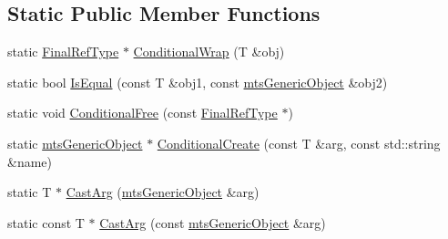 \subsection*{Static Public Member Functions}
\begin{DoxyCompactItemize}
\item 
static \hyperlink{classmts_generic_types_impl_3_01_t_00_01true_01_4_a76ded5912b20f9057bf7835ca04cfb89}{Final\-Ref\-Type} $\ast$ \hyperlink{classmts_generic_types_impl_3_01_t_00_01true_01_4_aef2b40c8a72a6fbe7aecc055f259c5c6}{Conditional\-Wrap} (T \&obj)
\item 
static bool \hyperlink{classmts_generic_types_impl_3_01_t_00_01true_01_4_a8b7cc64482c685ad2be96d0906bc18d2}{Is\-Equal} (const T \&obj1, const \hyperlink{classmts_generic_object}{mts\-Generic\-Object} \&obj2)
\item 
static void \hyperlink{classmts_generic_types_impl_3_01_t_00_01true_01_4_a4eb2f1e60e027075ca90cf7a23a5f3fc}{Conditional\-Free} (const \hyperlink{classmts_generic_types_impl_3_01_t_00_01true_01_4_a76ded5912b20f9057bf7835ca04cfb89}{Final\-Ref\-Type} $\ast$)
\item 
static \hyperlink{classmts_generic_object}{mts\-Generic\-Object} $\ast$ \hyperlink{classmts_generic_types_impl_3_01_t_00_01true_01_4_a289a718404559aac15f4952f407e9149}{Conditional\-Create} (const T \&arg, const std\-::string \&name)
\item 
static T $\ast$ \hyperlink{classmts_generic_types_impl_3_01_t_00_01true_01_4_ae9a9bd60b09ed13ef953e329863f382b}{Cast\-Arg} (\hyperlink{classmts_generic_object}{mts\-Generic\-Object} \&arg)
\item 
static const T $\ast$ \hyperlink{classmts_generic_types_impl_3_01_t_00_01true_01_4_a790b68e26f2a7aec9fde15cbf2372eed}{Cast\-Arg} (const \hyperlink{classmts_generic_object}{mts\-Generic\-Object} \&arg)
\end{DoxyCompactItemize}


